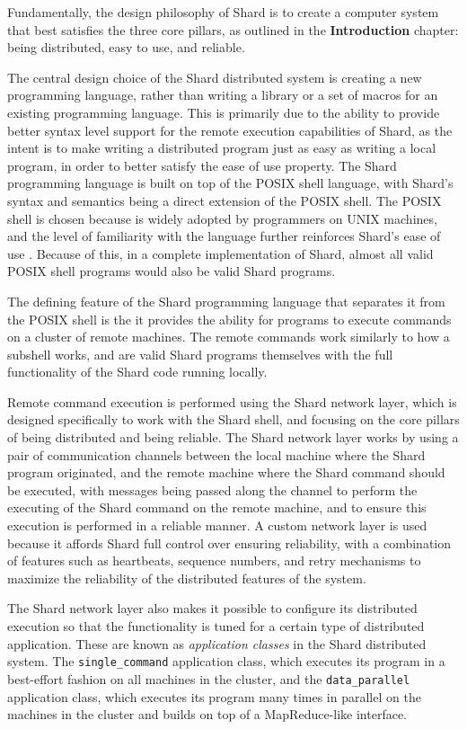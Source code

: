 \documentclass[oneside]{report}
\begin{document}
Fundamentally, the design philosophy of Shard is to create a computer system that best satisfies the three core pillars, as outlined in the \textbf{Introduction} chapter: being distributed, easy to use, and reliable.

The central design choice of the Shard distributed system is creating a new programming language, rather than writing a library or a set of macros for an existing programming language.
This is primarily due to the ability to provide better syntax level support for the remote execution capabilities of Shard, as the intent is to make writing a distributed program just as easy as writing a local program, in order to better satisfy the ease of use property.
The Shard programming language is built on top of the POSIX shell language, with Shard's syntax and semantics being a direct extension of the POSIX shell.
The POSIX shell is chosen because is widely adopted by programmers on UNIX machines, and the level of familiarity with the language further reinforces Shard's ease of use \cite{posix2017}.
Because of this, in a complete implementation of Shard, almost all valid POSIX shell programs would also be valid Shard programs.

The defining feature of the Shard programming language that separates it from the POSIX shell is the it provides the ability for programs to execute commands on a cluster of remote machines.
The remote commands work similarly to how a subshell works, and are valid Shard programs themselves with the full functionality of the Shard code running locally.

Remote command execution is performed using the Shard network layer, which is designed specifically to work with the Shard shell, and focusing on the core pillars of being distributed and being reliable.
The Shard network layer works by using a pair of communication channels between the local machine where the Shard program originated, and the remote machine where the Shard command should be executed, with messages being passed along the channel to perform the executing of the Shard command on the remote machine, and to ensure this execution is performed in a reliable manner.
A custom network layer is used because it affords Shard full control over ensuring reliability, with a combination of features such as heartbeats, sequence numbers, and retry mechanisms to maximize the reliability of the distributed features of the system.

The Shard network layer also makes it possible to configure its distributed execution so that the functionality is tuned for a certain type of distributed application.
These are known as \textit{application classes} in the Shard distributed system.
The \texttt{single\_command} application class, which executes its program in a best-effort fashion on all machines in the cluster, and the \texttt{data\_parallel} application class, which executes its program many times in parallel on the machines in the cluster and builds on top of a MapReduce-like \cite{dean2004mapreduce} interface.
\end{document}

